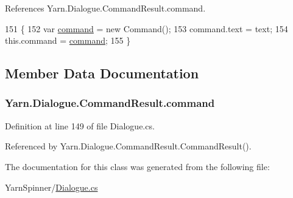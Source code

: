 References Yarn.\-Dialogue.\-Command\-Result.\-command.


\begin{DoxyCode}
151                                                \{
152                 var \hyperlink{a00046_a420ca0984d6e5c33bb761654305c592e}{command} = \textcolor{keyword}{new} Command();
153                 command.text = text;
154                 this.command = \hyperlink{a00046_a420ca0984d6e5c33bb761654305c592e}{command};
155             \}
\end{DoxyCode}


\subsection{Member Data Documentation}
\hypertarget{a00046_a420ca0984d6e5c33bb761654305c592e}{
\subsubsection[{command}]{ Yarn.\-Dialogue.\-Command\-Result.\-command}}\label{a00046_a420ca0984d6e5c33bb761654305c592e}


Definition at line 149 of file Dialogue.\-cs.



Referenced by Yarn.\-Dialogue.\-Command\-Result.\-Command\-Result().



The documentation for this class was generated from the following file\-:\begin{DoxyCompactItemize}
\item 
Yarn\-Spinner/\hyperlink{a00296}{Dialogue.\-cs}\end{DoxyCompactItemize}
